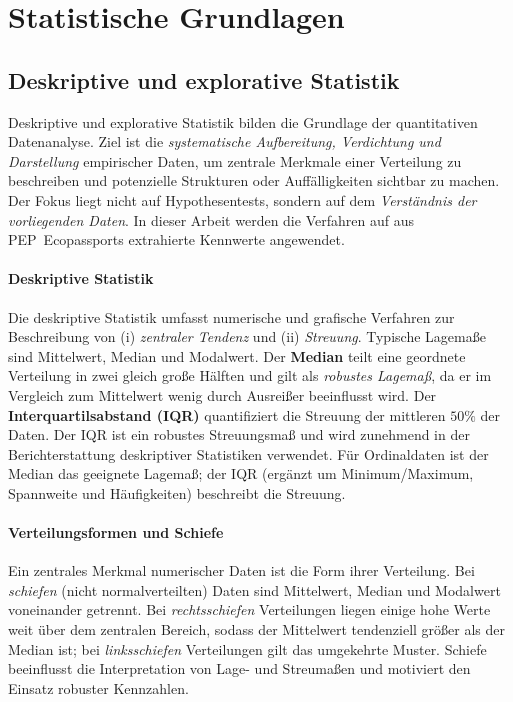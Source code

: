 \section{Statistische Grundlagen}

\subsection{Deskriptive und explorative Statistik}
Deskriptive und explorative Statistik bilden die Grundlage der quantitativen Datenanalyse. 
Ziel ist die \emph{systematische Aufbereitung, Verdichtung und Darstellung} empirischer Daten,
um zentrale Merkmale einer Verteilung zu beschreiben und potenzielle Strukturen oder Auffälligkeiten sichtbar zu machen.
Der Fokus liegt nicht auf Hypothesentests, sondern auf dem \emph{Verständnis der vorliegenden Daten}. In dieser Arbeit werden die 
Verfahren auf aus PEP~Ecopassports extrahierte Kennwerte angewendet.

\paragraph{Deskriptive Statistik}
Die deskriptive Statistik umfasst numerische und grafische Verfahren zur Beschreibung von
(i) \emph{zentraler Tendenz} und (ii) \emph{Streuung}. \cite{Fisher2009}
Typische Lagemaße sind Mittelwert, Median und Modalwert. 
Der \textbf{Median} teilt eine geordnete Verteilung in zwei gleich große Hälften und gilt als \emph{robustes Lagemaß}, 
da er im Vergleich zum Mittelwert wenig durch Ausreißer beeinflusst wird. \cite{Dimić2019}
Der \textbf{Interquartilsabstand (IQR)} quantifiziert die Streuung der mittleren $50\%$ der Daten.
Der IQR ist ein robustes Streuungsmaß und wird zunehmend in der Berichterstattung deskriptiver Statistiken verwendet.
Für Ordinaldaten ist der Median das geeignete Lagemaß; der IQR (ergänzt um Minimum/Maximum, Spannweite und Häufigkeiten) beschreibt die Streuung. \cite{Fisher2009}

\paragraph{Verteilungsformen und Schiefe}
Ein zentrales Merkmal numerischer Daten ist die Form ihrer Verteilung.
Bei \emph{schiefen} (nicht normalverteilten) Daten sind Mittelwert, Median und Modalwert voneinander getrennt.
Bei \emph{rechtsschiefen} Verteilungen liegen einige hohe Werte weit über dem zentralen Bereich, sodass der Mittelwert 
tendenziell größer als der Median ist; bei \emph{linksschiefen} Verteilungen gilt das umgekehrte Muster.
Schiefe beeinflusst die Interpretation von Lage- und Streumaßen und motiviert den Einsatz robuster Kennzahlen.

